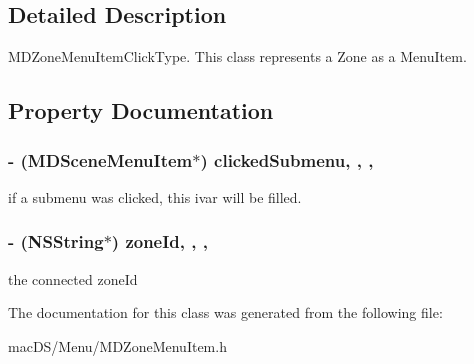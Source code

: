 \subsection{Detailed Description}
M\-D\-Zone\-Menu\-Item\-Click\-Type. This class represents a Zone as a Menu\-Item. 

\subsection{Property Documentation}
\hypertarget{interface_m_d_zone_menu_item_a6a4957a6b3fe720a65aa67f6c07be18f}{
\subsubsection[{clicked\-Submenu}]{\setlength{\rightskip}{0pt plus 5cm}-\/ ({\bf M\-D\-Scene\-Menu\-Item}$\ast$) clicked\-Submenu\hspace{0.3cm}{\ttfamily [read]}, {\ttfamily [write]}, {\ttfamily [atomic]}, {\ttfamily [strong]}}}\label{interface_m_d_zone_menu_item_a6a4957a6b3fe720a65aa67f6c07be18f}
if a submenu was clicked, this ivar will be filled. \hypertarget{interface_m_d_zone_menu_item_a0233a890891b84a2c30226439a3185ea}{
\subsubsection[{zone\-Id}]{\setlength{\rightskip}{0pt plus 5cm}-\/ (N\-S\-String$\ast$) zone\-Id\hspace{0.3cm}{\ttfamily [read]}, {\ttfamily [write]}, {\ttfamily [atomic]}, {\ttfamily [strong]}}}\label{interface_m_d_zone_menu_item_a0233a890891b84a2c30226439a3185ea}
the connected zone\-Id 

The documentation for this class was generated from the following file\-:\begin{DoxyCompactItemize}
\item 
mac\-D\-S/\-Menu/M\-D\-Zone\-Menu\-Item.\-h\end{DoxyCompactItemize}
